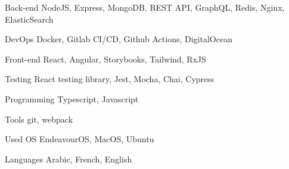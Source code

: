 

\begin{cvskills}

  \cvskill
    {Back-end} %
    {NodeJS, Express, MongoDB, REST API, GraphQL, Redis, Nginx, ElasticSearch} %

  \cvskill
    {DevOps} %
    {Docker, Gitlab CI/CD, Github Actions, DigitalOcean} %

  \cvskill
    {Front-end} %
    {React, Angular, Storybooks, Tailwind, RxJS} %

  \cvskill
    {Testing} %
    {React testing library, Jest, Mocha, Chai, Cypress} %

  \cvskill
    {Programming} %
    {Typescript, Javascript} %

  \cvskill
    {Tools} %
    {git, webpack} %

  \cvskill
    {Used OS} %
    {EndeavourOS, MacOS, Ubuntu} %

  \cvskill
    {Languages} %
    {Arabic, French, English} %

\end{cvskills}
